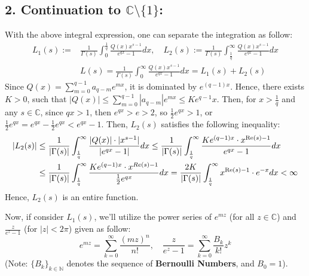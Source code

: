 \documentclass{article}
\newcommand{\NN}{\mathbb{N}}
\newcommand{\CC}{\mathbb{C}}
\newcommand{\Real}{\textmd{Re}}
\begin{document}
\subsection*{2. Continuation to $\mathbb{C}\setminus\{1\}$:}
With the above integral expression, one can separate the integration as follow:
\begin{equation}
    \label{eq:6}
    \begin{split}
        L_1(s):=&\frac{1}{\Gamma(s)}\int_{0}^{\frac{1}{q}}\frac{Q(x)x^{s-1}}{e^{qx}-1}dx,\quad L_2(s):=\frac{1}{\Gamma(s)}\int_{\frac{1}{q}}^{\infty}\frac{Q(x)x^{s-1}}{e^{qx}-1}dx\\
        &L(s) = \frac{1}{\Gamma(s)}\int_{0}^{\infty}\frac{Q(x)x^{s-1}}{e^{qx}-1}dx = L_1(s)+L_2(s)
    \end{split}
\end{equation}
Since $Q(x)=\sum_{m=0}^{q-1}a_{q-m}e^{mx}$, it is dominated by $e^{(q-1)x}$. Hence, there exists $K>0$, such that $|Q(x)|\leq \sum_{m=0}^{q-1}|a_{q-m}|e^{mx}\leq Ke^{q-1}x$. Then, for $x>\frac{1}{q}$ and any $s\in\mathbb{C}$, since $qx >1$, then $e^{qx}>e>2$, so $\frac{1}{2}e^{qx}>1$, or $\frac{1}{2}e^{qx}=e^{qx}-\frac{1}{2}e^{qx}<e^{qx}-1$. Then, $L_2(s)$ satisfies the following inequality:
\begin{equation}
    \label{eq:7}
    \begin{split}
        |L_2(s)|&\leq \frac{1}{|\Gamma(s)|}\int_{\frac{1}{q}}^{\infty}\frac{|Q(x)|\cdot|x^{s-1}|}{|e^{qx}-1|}dx \leq \frac{1}{|\Gamma(s)|}\int_{\frac{1}{q}}^{\infty}\frac{Ke^{(q-1)x}\cdot x^{\textmd{Re}(s)-1}}{e^{qx}-1}dx\\
        &\leq \frac{1}{|\Gamma(s)|}\int_{\frac{1}{q}}^{\infty}\frac{Ke^{(q-1)x}\cdot x^{Re(s)-1}}{\frac{1}{2}e^{qx}}dx = \frac{2K}{|\Gamma(s)|}\int_{\frac{1}{q}}^{\infty}x^{\Real(s)-1}\cdot e^{-x}dx < \infty
    \end{split}
\end{equation}
Hence, $L_2(s)$ is an entire function.

Now, if consider $L_1(s)$, we'll utilize the power series of $e^{mz}$ (for all $z\in\CC$) and $\frac{z}{e^z-1}$ (for $|z|<2\pi$) given as follow:
\begin{equation}
    \label{eq:8}
    e^{mz} = \sum_{k=0}^{\infty}\frac{(mz)^n}{n!},\quad \frac{z}{e^z-1}=\sum_{k=0}^{\infty}\frac{B_k}{k!}z^k
\end{equation}
(Note: $\{B_k\}_{k\in\NN}$ denotes the sequence of \textbf{Bernoulli Numbers}, and $B_0=1$).
\end{document}

